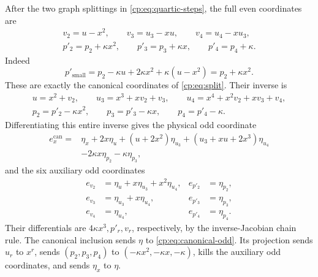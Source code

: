 After the two graph splittings in \eqref{cp:eq:quartic-steps},
the full even coordinates are
\begin{equation}\label{cp:eq:quartic-full-split}
 \begin{gathered}
 v_2=u-x^2,\qquad v_3=u_3-xu,\qquad v_4=u_4-xu_3,\\
 p'_2=p_2+\kappa x^2,\qquad
 p'_3=p_3+\kappa x,\qquad p'_4=p_4+\kappa.
 \end{gathered}
\end{equation}
Indeed
\[
 p'_{\mathrm{small}}
 =p_2-\kappa u+2\kappa x^2+\kappa(u-x^2)
 =p_2+\kappa x^2.
\]
These are exactly the canonical coordinates of
\eqref{cp:eq:split}.  Their inverse is
\[
 \begin{gathered}
 u=x^2+v_2,\qquad
 u_3=x^3+xv_2+v_3,\qquad
 u_4=x^4+x^2v_2+xv_3+v_4,\\
 p_2=p'_2-\kappa x^2,\qquad
 p_3=p'_3-\kappa x,\qquad
 p_4=p'_4-\kappa.
 \end{gathered}
\]
Differentiating this entire inverse gives the physical odd coordinate
\begin{equation}\label{cp:eq:canonical-odd}
 \begin{split}
 e_x^{\mathrm{can}}={}&
 \eta_x+2x\eta_u+(u+2x^2)\eta_{u_3}
 +(u_3+xu+2x^3)\eta_{u_4}\\
 &-2\kappa x\eta_{p_2}-\kappa\eta_{p_3},
 \end{split}
\end{equation}
and the six auxiliary odd coordinates
\begin{equation}\label{cp:eq:canonical-aux-odd}
 \begin{aligned}
 e_{v_2}&=\eta_u+x\eta_{u_3}+x^2\eta_{u_4},
 &e_{p'_2}&=\eta_{p_2},\\
 e_{v_3}&=\eta_{u_3}+x\eta_{u_4},
 &e_{p'_3}&=\eta_{p_3},\\
 e_{v_4}&=\eta_{u_4},
 &e_{p'_4}&=\eta_{p_4}.
 \end{aligned}
\end{equation}
Their differentials are \(4\kappa x^3,p'_r,v_r\), respectively,
by the inverse-Jacobian chain rule.  The canonical inclusion sends
\(\eta\) to \eqref{cp:eq:canonical-odd}.  Its projection sends
\(u_r\) to \(x^r\), sends
\((p_2,p_3,p_4)\) to \((-\kappa x^2,-\kappa x,-\kappa)\),
kills the auxiliary odd coordinates, and sends \(\eta_x\) to \(\eta\).

